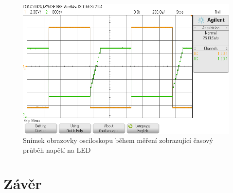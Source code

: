 \documentclass[a4paper, czech]{article}
\begin{document}
\begin{figure}[H]
    \centering
    \includegraphics[width=\textwidth]{osciloskop_uloha8.png}
    \caption{Snímek obrazovky osciloskopu během měření zobrazující časový průběh napětí na LED}
\end{figure}

\section{Závěr}
\end{document}
